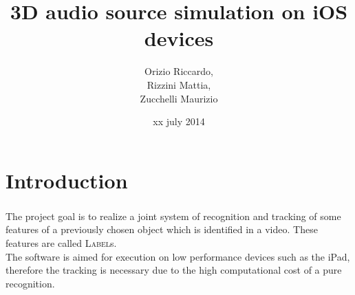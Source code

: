 \documentclass{beamer}
\title{3D audio source simulation on iOS devices}
\author[Orizio, Rizzini, Zucchelli]{Orizio Riccardo,\\Rizzini Mattia,\\Zucchelli Maurizio}
\date{xx july 2014}
\institute[UniBS]{University of Brescia}
\begin{document}
  \begin{frame}
    \maketitle
  \end{frame}

  \section{Introduction}
  
  \begin{frame}
    \frametitle{\insertsection}
    The project goal is to realize a joint system of recognition and tracking
    of some features of a previously chosen object which is identified in a
    video.  These features are called \textsc{Label}s.\\
    The software is aimed for execution on low performance devices such as the
    iPad, therefore the tracking is necessary due to the high computational
    cost of a pure recognition.\\
  \end{frame}

\end{document}
